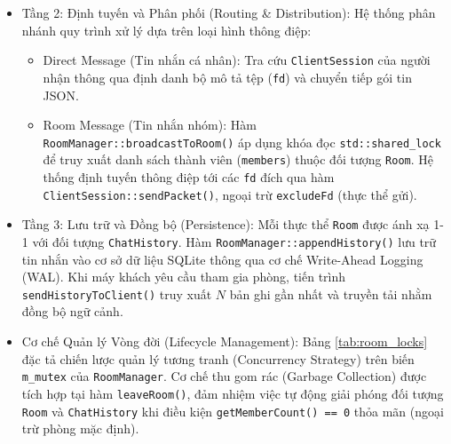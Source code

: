 \begin{enumerate}
\begin{itemize}[label={-}]
        \item Tầng 2: Định tuyến và Phân phối (Routing \& Distribution): Hệ thống phân nhánh quy trình xử lý dựa trên loại hình thông điệp:
        \begin{itemize}[label={$\circ$}]
            \item Direct Message (Tin nhắn cá nhân): Tra cứu \texttt{ClientSession} của người nhận thông qua định danh bộ mô tả tệp (\texttt{fd}) và chuyển tiếp gói tin JSON.
            \item Room Message (Tin nhắn nhóm): Hàm \texttt{RoomManager::broadcastToRoom()} áp dụng khóa đọc \texttt{std::shared\_lock} để truy xuất danh sách thành viên (\texttt{members}) thuộc đối tượng \texttt{Room}. Hệ thống định tuyến thông điệp tới các \texttt{fd} đích qua hàm \texttt{ClientSession::sendPacket()}, ngoại trừ \texttt{excludeFd} (thực thể gửi).
        \end{itemize}
        
        \item Tầng 3: Lưu trữ và Đồng bộ (Persistence): Mỗi thực thể \texttt{Room} được ánh xạ 1-1 với đối tượng \texttt{ChatHistory}. Hàm \texttt{RoomManager::appendHistory()} lưu trữ tin nhắn vào cơ sở dữ liệu SQLite thông qua cơ chế Write-Ahead Logging (WAL). Khi máy khách yêu cầu tham gia phòng, tiến trình \texttt{sendHistoryToClient()} truy xuất $N$ bản ghi gần nhất và truyền tải nhằm đồng bộ ngữ cảnh.
        
        \item Cơ chế Quản lý Vòng đời (Lifecycle Management): Bảng \ref{tab:room_locks} đặc tả chiến lược quản lý tương tranh (Concurrency Strategy) trên biến \texttt{m\_mutex} của \texttt{RoomManager}. Cơ chế thu gom rác (Garbage Collection) được tích hợp tại hàm \texttt{leaveRoom()}, đảm nhiệm việc tự động giải phóng đối tượng \texttt{Room} và \texttt{ChatHistory} khi điều kiện \texttt{getMemberCount() == 0} thỏa mãn (ngoại trừ phòng mặc định).
    \end{itemize}
\end{enumerate}

